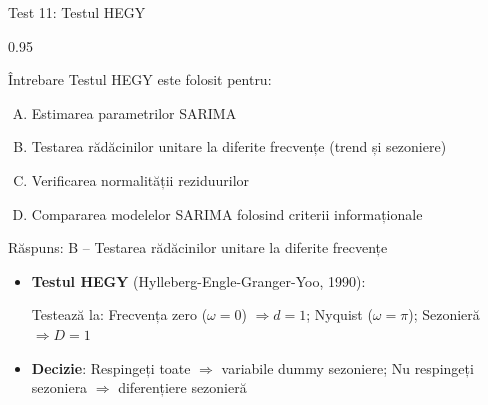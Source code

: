 \documentclass[9pt, aspectratio=169, t]{beamer}
\begin{document}
\begin{frame}{Test 11: Testul HEGY}
    \begin{cminipage}{0.95\textwidth}
    \begin{alertblock}{Întrebare}
        Testul HEGY este folosit pentru:
    \end{alertblock}

    \vspace{0.3cm}

    \begin{enumerate}[A)]\setlength{\itemsep}{0pt}
        \item Estimarea parametrilor SARIMA
        \item Testarea rădăcinilor unitare la diferite frecvențe (trend și sezoniere)
        \item Verificarea normalității reziduurilor
        \item Compararea modelelor SARIMA folosind criterii informaționale
    \end{enumerate}

    \vspace{0.5cm}
    \pause
    \begin{exampleblock}{Răspuns: B -- Testarea rădăcinilor unitare la diferite frecvențe}
        {\small
        \begin{itemize}\setlength{\itemsep}{0pt}
        \item \textbf{Testul HEGY} (Hylleberg-Engle-Granger-Yoo, 1990):

        Testează la: Frecvența zero ($\omega = 0$) $\Rightarrow d = 1$; Nyquist ($\omega = \pi$); Sezonieră $\Rightarrow D = 1$
        \item \textbf{Decizie}: Respingeți toate $\Rightarrow$ variabile dummy sezoniere; Nu respingeți sezoniera $\Rightarrow$ diferențiere sezonieră
        \end{itemize}
        }
    \end{exampleblock}
    \end{cminipage}
\end{frame}
\end{document}
